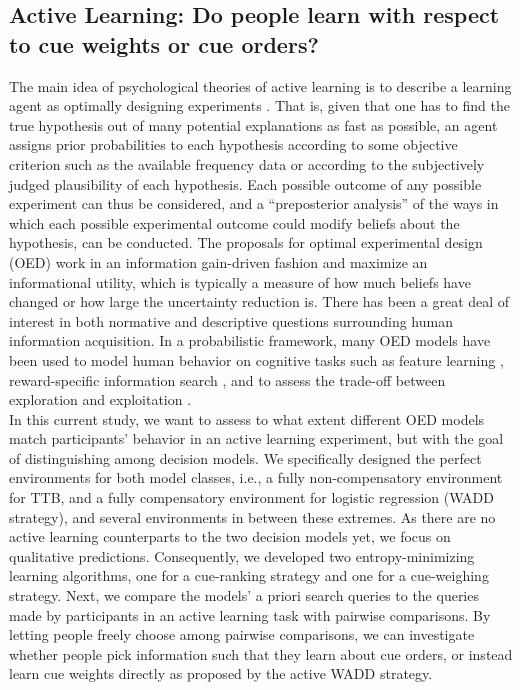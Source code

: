 \documentclass[10pt,letterpaper]{article}
\begin{document}
\subsection{Active Learning: Do people learn with respect to cue weights or cue orders?}
The main idea of psychological theories of active learning is to describe a learning agent as optimally designing experiments \citep{chaloner1989optimal}. That is, given that one has to find the true hypothesis out of many potential explanations as fast as possible, an agent assigns prior probabilities to each hypothesis according to some objective criterion such as the available frequency data or according to the subjectively judged plausibility of each hypothesis. Each possible outcome of any possible experiment can thus be considered, and a ``preposterior analysis'' \citep{raiffaapplied} of the ways in which each possible experimental outcome could modify beliefs about the hypothesis, can be conducted. The proposals for optimal experimental design (OED) work in an information gain-driven fashion and maximize an informational utility, which is typically a measure of how much beliefs have changed or how large the uncertainty reduction is. There has been a great deal of interest in both normative and descriptive questions surrounding human information acquisition. In a probabilistic framework, many OED models have been used to model human behavior on cognitive tasks such as feature learning \citep{griffiths2009analyzing}, reward-specific information search \citep{meder2012information}, and to assess the trade-off between exploration and exploitation \citep{knox2011nature}.\\
In this current study, we want to assess to what extent different OED models match participants' behavior in an active learning experiment, but with the goal of distinguishing among decision models. We specifically designed the perfect environments for both model classes, i.e., a fully non-compensatory environment for TTB, and a fully compensatory environment for logistic regression (WADD strategy), and several environments in between these extremes. As there are no active learning counterparts to the two decision models yet, we focus on qualitative predictions. Consequently, we developed two entropy-minimizing learning algorithms, one for a cue-ranking strategy and one for a cue-weighing strategy. Next, we compare the models' a priori search queries to the queries made by participants in an active learning task with pairwise comparisons. By letting people freely choose among pairwise comparisons, we can investigate whether people pick information such that they learn about cue orders, or instead learn cue weights directly as proposed by the active WADD strategy.
\end{document}
